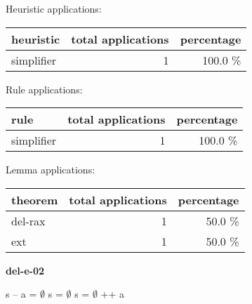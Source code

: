 \documentclass[a4paper]{article}
\begin{document}
\medskip


Heuristic applications:

\begin{supertabular}{l|r|r}
heuristic	& total applications & percentage \\ \hline
simplifier & 1 & 100.0 \% \\

\end{supertabular}

Rule applications:

\begin{supertabular}{l|r|r}
rule	        & total applications & percentage \\ \hline
simplifier & 1 & 100.0 \% \\

\end{supertabular}

Lemma applications:

\begin{supertabular}{l|r|r}
theorem	        & total applications & percentage \\ \hline
del-rax & 1 & 50.0 \% \\
ext & 1 & 50.0 \% \\

\end{supertabular}
\pagebreak

{\LARGE\bf del-e-02}\label{lemma-del-e-02}

\medskip

 \Fol s -- a = $\emptyset$ \Equiv s = $\emptyset$ \Or s = $\emptyset$ ++ a
\end{document}
